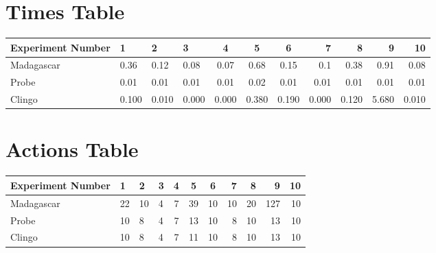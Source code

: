 \documentclass[8pt]{article}
\begin{document}
\begin{landscape}
\section{Times Table}\begin{tabular}{ | l | l | l | l | c | c | c | r | r | r | r | }\hline
Experiment Number & 1 & 2 & 3 & 4 & 5 & 6 & 7 & 8 & 9 & 10\\  \hline
Madagascar & 0.36 & 0.12 & 0.08 & 0.07 & 0.68 & 0.15 & 0.1 & 0.38 & 0.91 & 0.08\\  \hline
Probe & 0.01 & 0.01 & 0.01 & 0.01 & 0.02 & 0.01 & 0.01 & 0.01 & 0.01 & 0.01\\  \hline
Clingo & 0.100 & 0.010 & 0.000 & 0.000 & 0.380 & 0.190 & 0.000 & 0.120 & 5.680 & 0.010\\  \hline
\end{tabular}
\section{Actions Table}\begin{tabular}{ | l | l | l | l | c | c | c | r | r | r | r | }\hline
Experiment Number & 1 & 2 & 3 & 4 & 5 & 6 & 7 & 8 & 9 & 10\\ \hline
 Madagascar & 22 & 10 & 4 & 7 & 39 & 10 & 10 & 20 & 127 & 10\\ \hline
 Probe & 10 & 8 & 4 & 7 & 13 & 10 & 8 & 10 & 13 & 10\\ \hline
 Clingo & 10 & 8 & 4 & 7 & 11 & 10 & 8 & 10 & 13 & 10\\ \hline
\end{tabular}
\end{landscape}
\end{document}
